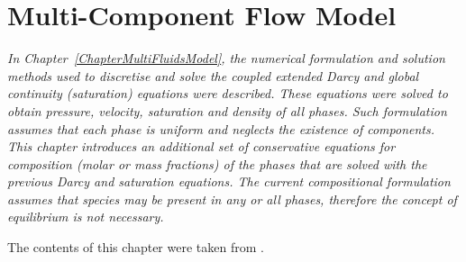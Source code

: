
\chapter{Multi-Component Flow Model}\label{Chapter:CompositionalModel}

\begin{adjustwidth}{1cm}{1cm}
    {\it In Chapter~\ref{ChapterMultiFluidsModel}, the numerical formulation and solution methods used to discretise and solve the coupled extended Darcy and global continuity (saturation) equations were described. These equations were solved to obtain pressure, velocity, saturation and density of all phases. Such formulation assumes that each phase is uniform and neglects the existence of components. This chapter introduces an additional set of conservative equations for composition (molar or mass fractions) of the phases that are solved with the previous Darcy and saturation equations. The current compositional formulation assumes that species may be present in any or all phases, therefore the concept of equilibrium is not necessary.
\medskip

The contents of this chapter were taken from \citet{Fluidity_Manual}.
}
\end{adjustwidth}

